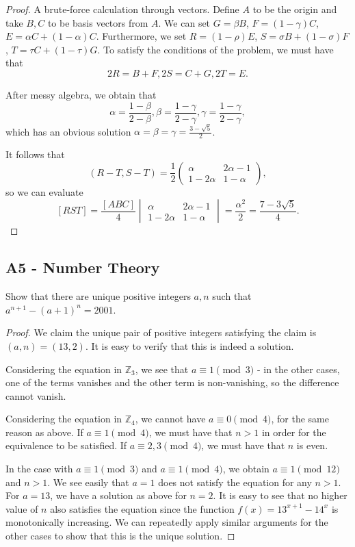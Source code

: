 \documentclass[11pt]{scrartcl}
\newcommand{\Z}{\mathbb{Z}}
\newcommand{\<}{\langle}
\renewcommand{\>}{\rangle}
\begin{document}
\begin{proof}
A brute-force calculation through vectors.  Define $A$ to be the origin and take $B, C$ to be basis vectors from $A$.  We can set $G = \beta B$, $F = (1 - \gamma) C$, $E = \alpha C + (1 - \alpha) C$.  Furthermore, we set $R = (1 - \rho) E$, $S = \sigma B + (1 - \sigma )F$, $T = \tau C + (1 - \tau) G$.  To satisfy the conditions of the problem, we must have that 
$$2R = B+F, 2S = C + G, 2T =  E.$$

After messy algebra, we obtain that 
$$\alpha = \frac{1 - \beta}{2 - \beta}, \beta = \frac{1 - \gamma}{2 - \gamma}, \gamma = \frac{1 - \gamma}{2 - \gamma},$$
which has an obvious solution $\alpha = \beta = \gamma = \frac{3 - \sqrt{5}}{2}$.  

It follows that 
$$(R-T, S- T) = \frac{1}{2}\begin{pmatrix} \alpha & 2\alpha - 1 \\ 1 - 2\alpha & 1 - \alpha \end{pmatrix},$$
so we can evaluate 
$$[RST] = \frac{[ABC]}{4} \begin{vmatrix}
 \alpha & 2\alpha - 1 \\ 1 - 2\alpha & 1 - \alpha
\end{vmatrix}  = \frac{\alpha^2}{2} = \frac{7 - 3\sqrt{5}}{4}.$$
\end{proof}
\pagebreak
\subsection{A5 - Number Theory}
 Show that there are unique positive integers $a, n$ such that $a^{n+1} - (a+1)^n = 2001$.

\begin{proof}
We claim the unique pair of positive integers satisfying the claim is $(a, n) = (13, 2)$.  It is easy to verify that this is indeed a solution.  

Considering the equation in $\Z_3$, we see that $a \equiv 1 \pmod{3}$ - in the other cases, one of the terms vanishes and the other term is non-vanishing, so the difference cannot vanish.  

Considering the equation in $\Z_4$, we cannot have $a \equiv 0 \pmod{4}$, for the same reason as above.  If $a \equiv 1 \pmod{4}$, we must have that $n > 1$ in order for the equivalence to be satisfied.  If $a \equiv 2, 3 \pmod{4}$, we must have that $n$ is even.  

In the case with $a \equiv 1 \pmod{3}$ and $a \equiv 1 \pmod{4}$, we obtain $a \equiv 1 \pmod{12}$ and $n > 1$.   We see easily that $a = 1$ does not satisfy the equation for any $n > 1$.  For $a = 13$, we have a solution as above for $n = 2$.  It is easy to see that no higher value of $n$ also satisfies the equation since the function $f(x) = 13^{x + 1} - 14^x$ is monotonically increasing.   We can repeatedly apply similar arguments for the other cases to show that this is the unique solution.  
\end{proof}
\pagebreak
\end{document}
